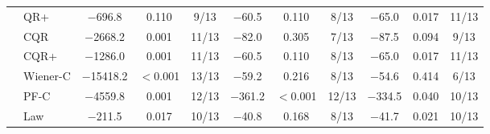 \begin{table}[!tbp]
\begin{tabular}{llccccccccc}
 & QR+ & $-$696.8 & 0.110 & 9/13 & $-$60.5 & 0.110 & 8/13 & $-$65.0 & 0.017 & 11/13\\
 & CQR & $-$2668.2 & 0.001 & 11/13 & $-$82.0 & 0.305 & 7/13 & $-$87.5 & 0.094 & 9/13\\
 & CQR+ & $-$1286.0 & 0.001 & 11/13 & $-$60.5 & 0.110 & 8/13 & $-$65.0 & 0.017 & 11/13\\
 & Wiener-C & $-$15418.2 & $<$0.001 & 13/13 & $-$59.2 & 0.216 & 8/13 & $-$54.6 & 0.414 & 6/13\\
 & PF-C & $-$4559.8 & 0.001 & 12/13 & $-$361.2 & $<$0.001 & 12/13 & $-$334.5 & 0.040 & 10/13\\
 & Law & $-$211.5 & 0.017 & 10/13 & $-$40.8 & 0.168 & 8/13 & $-$41.7 & 0.021 & 10/13\\
\bottomrule
\end{tabular}
\end{table}
